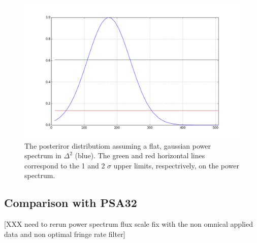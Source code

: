 \documentclass[twocolumn,numberedappendix]{emulateapj} \shorttitle{PSA64}
\begin{document}
\begin{figure}[h!]\centering
\includegraphics[width=\columnwidth]{plots/flat_k3pk_posterior.png}
\caption{The posteriror distributiom assuming a flat, gaussian power spectrum in
$\Delta^{2}$ (blue). The green and red horizontal lines correspond to the 1 and
2 $\sigma$ upper limits, respectrively, on the power spectrum.}
\label{fig:final_posterioir}
\end{figure}


\subsection{Comparison with PSA32}
[XXX need to rerun power spectrum flux scale fix with the non omnical applied
data and non optimal fringe rate filter]
%
%
%
\end{document}
